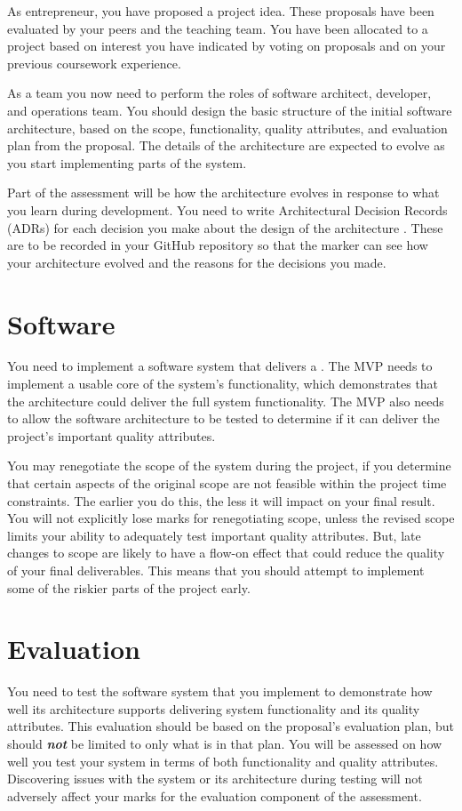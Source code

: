 \documentclass{csse4400}
\begin{document}
As entrepreneur, you have proposed a project idea.
These proposals have been evaluated by your peers and the teaching team.
You have been allocated to a project based on interest you have indicated by voting on proposals and on your previous coursework experience.

As a team you now need to perform the roles of software architect, developer, and operations team.
You should design the basic structure of the initial software architecture,
based on the scope, functionality, quality attributes, and evaluation plan from the proposal.
The details of the architecture are expected to evolve as you start implementing parts of the system.

Part of the assessment will be how the architecture evolves in response to what you learn during development.
You need to write Architectural Decision Records (ADRs) for each decision you make about the design of the architecture \cite{adr-notes}.
These are to be recorded in your GitHub repository so that the marker can see how your architecture evolved and the reasons for the decisions you made.


\section{Software}
You need to implement a software system that delivers a .
The MVP needs to implement a usable core of the system's functionality,
which demonstrates that the architecture could deliver the full system functionality.
The MVP also needs to allow the software architecture to be tested to determine if it can deliver the project's important quality attributes.

You may renegotiate the scope of the system during the project,
if you determine that certain aspects of the original scope are not feasible within the project time constraints.
The earlier you do this, the less it will impact on your final result.
You will not explicitly lose marks for renegotiating scope, unless the revised scope limits your ability to adequately test important quality attributes.
But, late changes to scope are likely to have a flow-on effect that could reduce the quality of your final deliverables.
This means that you should attempt to implement some of the riskier parts of the project early.


\section{Evaluation}
You need to test the software system that you implement to demonstrate
how well its architecture supports delivering system functionality and its quality attributes.
This evaluation should be based on the proposal's evaluation plan, but should \textbf{\emph{not}} be limited to only what is in that plan.
You will be assessed on how well you test your system in terms of both functionality and quality attributes.
Discovering issues with the system or its architecture during testing will not adversely affect your marks for the evaluation component of the assessment.
\end{document}
